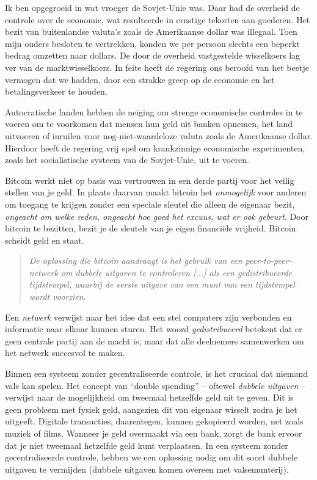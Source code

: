 Ik ben opgegroeid in wat vroeger de Sovjet-Unie was. Daar had de overheid de controle over de economie, wat resulteerde in ernstige tekorten aan goederen. Het bezit van buitenlandse valuta's zoals de Amerikaanse dollar was illegaal. Toen mijn ouders besloten te vertrekken, konden we per persoon slechts een beperkt bedrag omzetten naar dollars. De door de overheid vastgestelde wisselkoers lag ver van de marktwisselkoers. In feite heeft de regering ons beroofd van het beetje vermogen dat we hadden, door een strakke greep op de economie en het betalingsverkeer te houden.

Autocratische landen hebben de neiging om strenge economische controles in te voeren om te voorkomen dat mensen hun geld uit banken opnemen, het land uitvoeren of inruilen voor nog-niet-waardeloze valuta zoals de Amerikaanse dollar. Hierdoor heeft de regering vrij spel om krankzinnige economische experimenten, zoals het socialistische systeem van de Sovjet-Unie, uit te voeren.

Bitcoin werkt niet op basis van vertrouwen in een derde partij voor het veilig stellen van je geld. In plaats daarvan maakt bitcoin het \textit{onmogelijk} voor anderen om toegang te krijgen zonder een speciale sleutel die alleen de eigenaar bezit, \textit{ongeacht om welke reden, ongeacht hoe goed het excuus, wat er ook gebeurt}. Door bitcoin te bezitten, bezit je de sleutels van je eigen financiële vrijheid. Bitcoin scheidt geld en staat.

\begin{quote}
\textit{De oplossing die bitcoin aandraagt is het gebruik van een peer-to-peer-netwerk om dubbele uitgaven te controleren [...] als een gedistribueerde tijdstempel, waarbij de eerste uitgave van een munt van een tijdstempel wordt voorzien.}
\end{quote}

Een \textit{netwerk} verwijst naar het idee dat een stel computers zijn verbonden en informatie naar elkaar kunnen sturen. Het woord \textit{gedistribueerd} betekent dat er geen centrale partij aan de macht is, maar dat alle deelnemers samenwerken om het netwerk succesvol te maken.

Binnen een systeem zonder gecentraliseerde controle, is het cruciaal dat niemand vals kan spelen. Het concept van ``double spending'' -- oftewel \textit{dubbele uitgaven} -- verwijst naar de mogelijkheid om tweemaal hetzelfde geld uit te geven. Dit is geen probleem met fysiek geld, aangezien dit van eigenaar wisselt zodra je het uitgeeft. Digitale transacties, daarentegen, kunnen gekopieerd worden, net zoals muziek of films. Wanneer je geld overmaakt via een bank, zorgt de bank ervoor dat je niet tweemaal hetzelfde geld kunt verplaatsen. In een systeem zonder gecentraliseerde controle, hebben we een oplossing nodig om dit soort dubbele uitgaven te vermijden (dubbele uitgaven komen overeen met valsemunterij).

